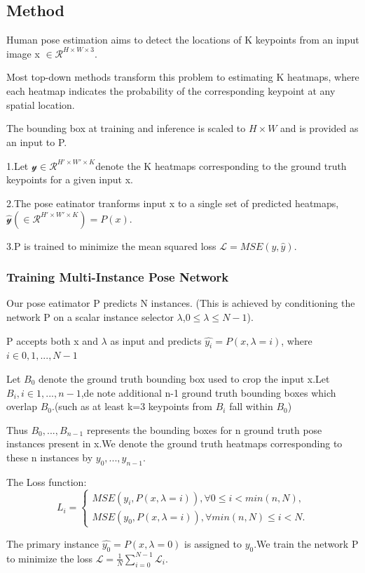 \documentclass[11pt]{article}
\begin{document}
\subsection{Method}
Human pose estimation aims to detect the locations of K keypoints from an input image x $\in \mathcal{R}^{H\times W\times 3}$.

Most top-down methods transform this problem to estimating K heatmaps, where each heatmap indicates the probability of the corresponding keypoint at any spatial location.

The bounding box at training and inference is scaled to $H\times W$ and is provided as an input to P.

1.Let $\mathcal{y} \in \mathcal{R}^{H'\times W'\times K}$denote the K heatmaps corresponding to the ground truth keypoints for a given input x.

2.The pose eatinator tranforms input x to a single set of predicted heatmaps, $\hat{\mathcal{y}}(\in \mathcal{R}^{H'\times W'\times K}) = P(x)$.

3.P is trained to minimize the mean squared loss $\mathcal{L} = MSE(y,\hat{y})$.
\subsubsection{Training Multi-Instance Pose Network}
Our pose eatimator P predicts N instances. (This is achieved by conditioning the network P on a scalar instance selector $\lambda$,$0\leq \lambda \leq N-1$).

P accepts both x and $\lambda$ as input and predicts $\hat{y_i} = P(x, \lambda=i)$, where $i\in {0,1,...,N-1}$

Let $B_0$ denote the ground truth bounding box used to crop the input x.Let $B_i, i\in {1,...,n-1}$,de note additional n-1 ground truth bounding boxes which overlap $B_0$.(such as at least k=3 keypoints from $B_i$ fall within $B_0$)

Thus $B_0,...,B_{n-1}$ represents the bounding boxes for n ground truth pose instances present in x.We denote the ground truth heatmaps corresponding to these n instances by $y_0,...,y_{n-1}$.

The Loss function:
$$L_i=\left\{\begin{matrix}
	MSE(y_i, P(x,\lambda =i)), \forall 0 \leq i< min(n,N),\\ 
	MSE(y_0, P(x,\lambda =i)), \forall min(n,N)\leq i<N .
\end{matrix}\right.$$

The primary instance $\hat{y_0} = P(x,\lambda=0)$ is assigned to $y_0$.We train the network P to minimize the loss $\mathcal{L} = \frac{1}{N}\sum_{i=0}^{N-1}\mathcal{L}_i$.
\end{document}
